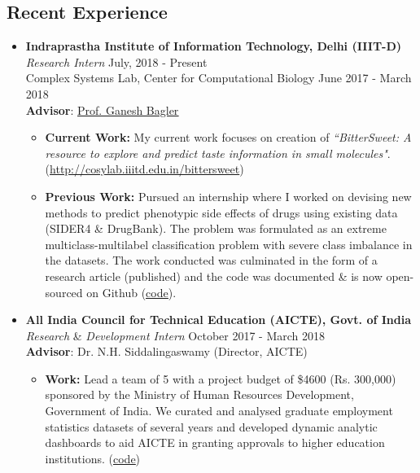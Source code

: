 \documentclass[margin,line]{res}
\begin{document}
\begin{resume}
\section{\sc Recent Experience}
\begin{itemize}[leftmargin=*]
\item {\bf Indraprastha Institute of Information Technology, Delhi (IIIT-D)}\\
\textit{Research Intern} \hfill July, 2018 - Present\\
Complex Systems Lab, Center for Computational Biology \hfill June 2017 - March 2018 \\  
{\bf Advisor}: {\href{https://scholar.google.co.in/citations?user=qyth_0QAAAAJ&hl=en}{\underline{Prof. Ganesh Bagler}}}
\begin{itemize}[leftmargin=*]
\item {\bf Current Work:} My current work focuses on creation of \textit{``BitterSweet: A resource to explore and predict taste information in small molecules"}. ({\href{http://cosylab.iiitd.edu.in/bittersweet/}{http://cosylab.iiitd.edu.in/bittersweet}})
\item {\bf Previous Work:} Pursued an internship where I worked on devising new methods to predict phenotypic side effects of drugs using existing data (SIDER4 \& DrugBank). The problem was formulated as an extreme multiclass-multilabel classification problem with severe class imbalance in the datasets. The work conducted was culminated in the form of a research article (published) and the code was documented \& is now open-sourced on Github ({\href{https://github.com/sominwadhwa/drugADR}{\underline{code}}}).
\end{itemize}
\item {\bf All India Council for Technical Education (AICTE), Govt. of India}\\
\textit{Research} \& \textit{Development Intern} \hfill October 2017 - March 2018\\  
{\bf Advisor}: Dr. N.H. Siddalingaswamy (Director, AICTE)
\begin{itemize}[leftmargin=*]
\item {\bf Work:} Lead a team of 5 with a project budget of \$4600 (Rs. 300,000) sponsored by the Ministry of Human Resources Development, Government of India. We curated and analysed graduate employment statistics datasets of several years and developed dynamic analytic dashboards to aid AICTE in granting approvals to higher education institutions. ({\href{https://github.com/TeamExtrapolate/extrapolate}{\underline{code}}})
\end{itemize}
\end{itemize}


\end{resume}
\end{document}
